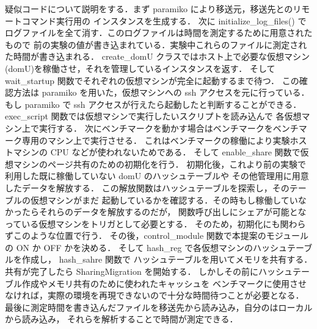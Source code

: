 \documentclass[graduation-thesis]{mlarticle}
\begin{document}
疑似コードについて説明をする．まず paramiko により移送元，移送先とのリモートコマンド実行用の
インスタンスを生成する．
次に initialize\_log\_files() でログファイルを全て消す．このログファイルは時間を測定するために用意されたもので
前の実験の値が書き込まれている．実験中これらのファイルに測定された時間が書き込まれる．
create\_domU クラスではホスト上で必要な仮想マシン(domU)を稼働させ，それを管理しているインスタンスを返す．
そして wait\_startup 関数でそれぞれの仮想マシンが完全に起動するまで待つ．
この確認方法は paramiko を用いた，仮想マシンへの ssh アクセスを元に行っている．
もし paramiko で ssh アクセスが行えたら起動したと判断することができる．
exec\_script 関数では仮想マシンで実行したいスクリプトを読み込んで
各仮想マシン上で実行する．
次にベンチマークを動かす場合はベンチマークをベンチマーク専用のマシン上で実行させる．
これはベンチマークの稼働により実験ホストマシンの CPU などが使われないためである．
そして enable\_share 関数で仮想マシンのページ共有のための初期化を行う．
初期化後，これより前の実験で利用した既に稼働していない domU のハッシュテーブルや
その他管理用に用意したデータを解放する．
この解放関数はハッシュテーブルを探索し，そのテーブルの仮想マシンがまだ
起動しているかを確認する．その時もし稼働していなかったらそれらのデータを解放するのだが，
関数呼び出しにシェアが可能となっている仮想マシンをトリガとして必要とする．
そのため，初期化にも関わらずこのような位置で行う．
その後，control\_module 関数で本提案のモジュールの ON か OFF かを決める．
そして hash\_reg で各仮想マシンのハッシュテーブルを作成し， hash\_sahre 関数で
ハッシュテーブルを用いてメモリを共有する．
共有が完了したら SharingMigration を開始する．
しかしその前にハッシュテーブル作成やメモリ共有のために使われたキャッシュを
ベンチマークに使用させなければ，実際の環境を再現できないので十分な時間待つことが必要となる．
最後に測定時間を書き込んだファイルを移送先から読み込み，自分のはローカルから読み込み，
それらを解析することで時間が測定できる．
\end{document}
